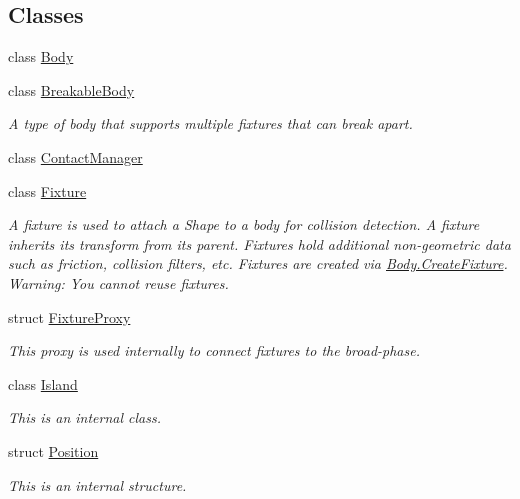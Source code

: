 \subsection*{Classes}
\begin{DoxyCompactItemize}
\item 
class \hyperlink{class_farseer_physics_1_1_dynamics_1_1_body}{Body}
\item 
class \hyperlink{class_farseer_physics_1_1_dynamics_1_1_breakable_body}{Breakable\+Body}
\begin{DoxyCompactList}\small\item\em A type of body that supports multiple fixtures that can break apart. \end{DoxyCompactList}\item 
class \hyperlink{class_farseer_physics_1_1_dynamics_1_1_contact_manager}{Contact\+Manager}
\item 
class \hyperlink{class_farseer_physics_1_1_dynamics_1_1_fixture}{Fixture}
\begin{DoxyCompactList}\small\item\em A fixture is used to attach a Shape to a body for collision detection. A fixture inherits its transform from its parent. Fixtures hold additional non-\/geometric data such as friction, collision filters, etc. Fixtures are created via \hyperlink{class_farseer_physics_1_1_dynamics_1_1_body_af7fe516c55d961070fdde4f3b280e771}{Body.\+Create\+Fixture}. Warning\+: You cannot reuse fixtures. \end{DoxyCompactList}\item 
struct \hyperlink{struct_farseer_physics_1_1_dynamics_1_1_fixture_proxy}{Fixture\+Proxy}
\begin{DoxyCompactList}\small\item\em This proxy is used internally to connect fixtures to the broad-\/phase. \end{DoxyCompactList}\item 
class \hyperlink{class_farseer_physics_1_1_dynamics_1_1_island}{Island}
\begin{DoxyCompactList}\small\item\em This is an internal class. \end{DoxyCompactList}\item 
struct \hyperlink{struct_farseer_physics_1_1_dynamics_1_1_position}{Position}
\begin{DoxyCompactList}\small\item\em This is an internal structure. \end{DoxyCompactList}\item 

\end{DoxyCompactItemize}

